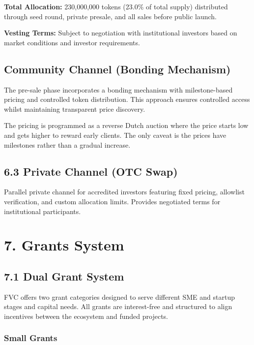 \documentclass[
  paper=a4,
  ,captions=tableheading
]{scrartcl}
\begin{document}
\textbf{Total Allocation:} 230,000,000 tokens (23.0\% of total supply) distributed through seed round, private presale, and all sales before public launch.

\textbf{Vesting Terms:} Subject to negotiation with institutional investors based on market conditions and investor requirements.

\subsection{Community Channel (Bonding Mechanism)}\label{community-channel-bonding-mechanism}

The pre-sale phase incorporates a bonding mechanism with milestone-based pricing and controlled token distribution. This approach ensures controlled access whilst maintaining transparent price discovery.

The pricing is programmed as a reverse Dutch auction where the price starts low and gets higher to reward early clients. The only caveat is the prices have milestones rather than a gradual increase.

\subsection{6.3 Private Channel (OTC Swap)}\label{private-channel-otc-swap}

Parallel private channel for accredited investors featuring fixed pricing, allowlist verification, and custom allocation limits. Provides negotiated terms for institutional participants.

\section{7. Grants System}\label{grants-system}

\subsection{7.1 Dual Grant System}\label{dual-grant-system}

FVC offers two grant categories designed to serve different
SME and startup stages and capital needs.
All grants are interest-free and structured to align incentives between
the ecosystem and funded projects.

\subsubsection{Small Grants}\label{small-grants}
\end{document}
